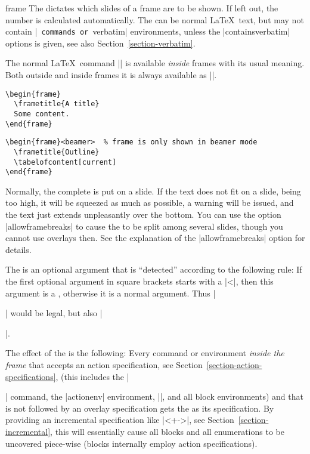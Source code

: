 \begin{environment}{{frame}%
    }
  The  dictates which slides of a frame are
  to be shown. If left out, the number is calculated automatically.
  The  can be normal \LaTeX\ text, but may not contain
  |\verb| commands or |verbatim| environments, unless the
  |containsverbatim| options is given, see also
  Section~\ref{section-verbatim}. 
 
  The normal \LaTeX\ command |\frame| is available \emph{inside}
  frames with its usual meaning. Both outside and inside frames it is
  always available as {\color{red!75!black}|\framelatex|}. 
 
  \example
\begin{verbatim}
\begin{frame}
  \frametitle{A title}
  Some content.
\end{frame}
\end{verbatim}
  
  \example
\begin{verbatim}
\begin{frame}<beamer>  % frame is only shown in beamer mode
  \frametitle{Outline}
  \tabelofcontent[current]
\end{frame}
\end{verbatim}

  Normally, the complete  is put on a slide. If
  the text does not fit on a slide, being too high, it will be
  squeezed as much as possible, a warning will be issued, and the text
  just extends unpleasantly over the bottom. You can use the option
  |allowframebreaks| to cause the  to be split among several
  slides, though you cannot use overlays then. See the explanation of
  the |allowframebreaks| option for details. 
  
  The  is an optional argument
  that is ``detected'' according to the following rule: If the first
  optional argument in square brackets starts with a |<|, then this
  argument is a , otherwise it is
  a normal  argument. Thus |\begin{frame}[<+->][plain]| would
  be legal, but also |\begin{frame}[plain]|.

  The effect of the  is the
  following: Every command or environment \emph{inside the frame} that
  accepts an action specification, see
  Section~\ref{section-action-specifications}, (this includes the
  |\item| command, the |actionenv| environment, |\action|, and all
  block environments) and that is not followed by 
  an overlay specification gets the  as its specification. By providing an incremental
  specification like |<+->|, see Section~\ref{section-incremental},
  this will essentially cause all blocks and all enumerations to be
  uncovered piece-wise (blocks internally employ action
  specifications).
  

\end{frame}
\end{frame}
\end{environment}
